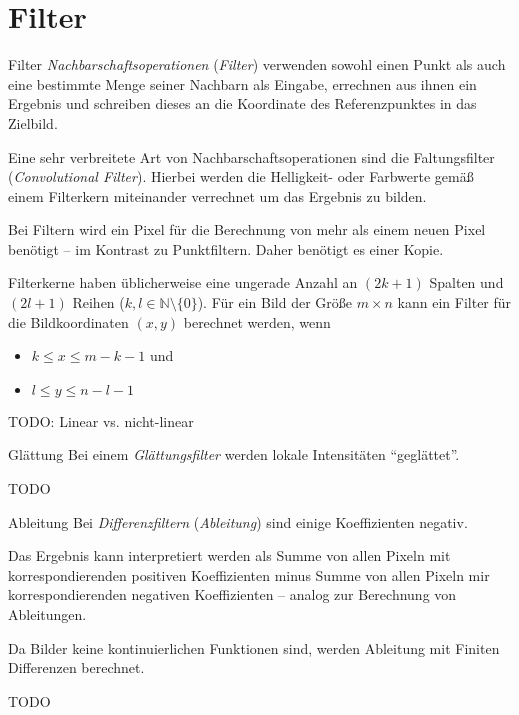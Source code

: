 \section{Filter}

\begin{defi}{Filter}
    \emph{Nachbarschaftsoperationen} (\emph{Filter}) verwenden sowohl einen Punkt als auch eine bestimmte Menge seiner Nachbarn als Eingabe, errechnen aus ihnen ein Ergebnis und schreiben dieses an die Koordinate des Referenzpunktes in das Zielbild.

    Eine sehr verbreitete Art von Nachbarschaftsoperationen sind die Faltungsfilter (\emph{Convolutional Filter}).
    Hierbei werden die Helligkeit- oder Farbwerte gemäß einem Filterkern miteinander verrechnet um das Ergebnis zu bilden.

    Bei Filtern wird ein Pixel für die Berechnung von mehr als einem neuen Pixel benötigt -- im Kontrast zu Punktfiltern.
    Daher benötigt es einer Kopie.

    Filterkerne haben üblicherweise eine ungerade Anzahl an $(2k + 1)$ Spalten und $(2l + 1)$ Reihen ($k, l \in \mathbb{N} \setminus \{0\}$).
    Für ein Bild der Größe $m \times n$ kann ein Filter für die Bildkoordinaten $(x, y)$ berechnet werden, wenn
    \begin{itemize}
        \item $k \leq x \leq m - k - 1$ und
        \item $l \leq y \leq n - l - 1$
    \end{itemize}

    TODO: Linear vs. nicht-linear
\end{defi}

\begin{defi}[Filter]{Glättung}
    Bei einem \emph{Glättungsfilter} werden lokale Intensitäten \enquote{geglättet}.

    TODO
\end{defi}

\begin{defi}[Filter]{Ableitung}
    Bei \emph{Differenzfiltern} (\emph{Ableitung}) sind einige Koeffizienten negativ.

    Das Ergebnis kann interpretiert werden als Summe von allen Pixeln mit korrespondierenden positiven Koeffizienten minus Summe von allen Pixeln mir korrespondierenden negativen Koeffizienten -- analog zur Berechnung von Ableitungen.

    Da Bilder keine kontinuierlichen Funktionen sind, werden Ableitung mit Finiten Differenzen berechnet.

    TODO
\end{defi}

